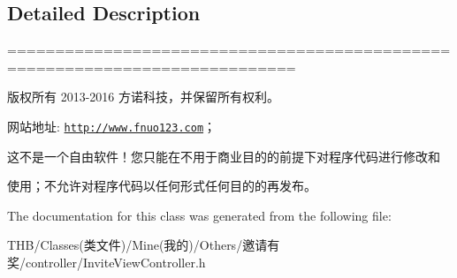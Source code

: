 \subsection{Detailed Description}
============================================================================

版权所有 2013-\/2016 方诺科技，并保留所有权利。

网站地址\+: \href{http://www.fnuo123.com}{\tt http\+://www.\+fnuo123.\+com}； 



这不是一个自由软件！您只能在不用于商业目的的前提下对程序代码进行修改和

使用；不允许对程序代码以任何形式任何目的的再发布。 

 

The documentation for this class was generated from the following file\+:\begin{DoxyCompactItemize}
\item 
T\+H\+B/\+Classes(类文件)/\+Mine(我的)/\+Others/邀请有奖/controller/Invite\+View\+Controller.\+h\end{DoxyCompactItemize}

